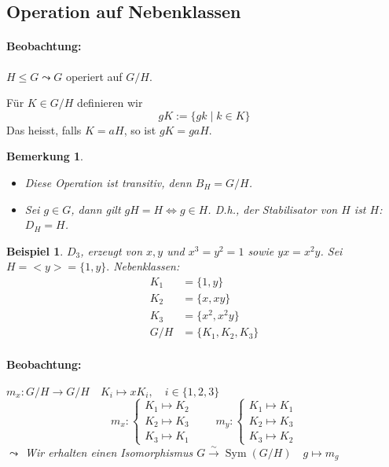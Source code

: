 \documentclass{article}
\theoremstyle{plain}
\newtheorem{beispiel}{Beispiel}
\newtheorem{bemerkung}{Bemerkung}
\newcommand{\defeq}{:=}
\newcommand{\ug}{\leq}
\newcommand{\zykl}[1]{{<}{#1}{>}}
\newcommand{\sym}{\mathop{\text{Sym}}}
\begin{document}
\subsection*{Operation auf Nebenklassen}
\paragraph{Beobachtung:} $H\ug G \leadsto G$ operiert auf $G/H$.

Für $K\in G/H$ definieren wir 
$$gK \defeq \{gk\mid k\in K\}$$
Das heisst, falls $K=aH$, so ist $gK=gaH$.

\begin{bemerkung}
    \begin{itemize}
        \item Diese Operation ist transitiv, denn $B_H=G/H$.
        \item Sei $g\in G$, dann gilt $gH=H\Leftrightarrow g\in H$. D.h., der Stabilisator von $H$ ist $H$: $D_H=H$.
    \end{itemize}
\end{bemerkung}
\begin{beispiel}
    $D_3$, erzeugt von $x,y$ und $x^3=y^2=1$ sowie $yx=x^2y$.
    Sei $H=\zykl{y}=\{1,y\}.$
    Nebenklassen:
    \begin{align*}
        K_1&=\{1,y\}\\
        K_2&=\{x,xy\}\\
        K_3&=\{x^2,x^2y\}\\
        G/H&=\{K_1,K_2,K_3\}
    \end{align*}

    \paragraph{Beobachtung:} $m_x\colon G/H\to G/H\quad K_i\mapsto xK_i,\quad i\in\{1,2,3\}$
    $$m_x\colon\begin{cases}
        K_1\mapsto K_2\\
        K_2\mapsto K_3\\
        K_3\mapsto K_1
    \end{cases} \qquad m_y\colon\begin{cases}
        K_1\mapsto K_1\\
        K_2\mapsto K_3\\
        K_3\mapsto K_2
    \end{cases}$$
    $\leadsto$ Wir erhalten einen Isomorphismus $G\xrightarrow{\sim} \sym(G/H)\quad g\mapsto m_g$
\end{beispiel}
\end{document}
